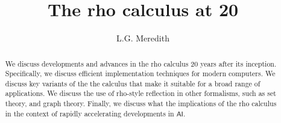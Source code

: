 \def\lastname{Meredith}

\title{The rho calculus at 20}

\author{ L.G. Meredith }

\maketitle              %


\begin{abstract}

  We discuss developments and advances in the rho calculus 20 years
  after its inception. Specifically, we discuss efficient
  implementation techniques for modern computers. We discuss key
  variants of the the calculus that make it suitable for a broad range
  of applications. We discuss the use of rho-style reflection in other
  formalisms, such as set theory, and graph theory. Finally, we
  discuss what the implications of the rho calculus in the context of
  rapidly accelerating developments in $\mathsf{AI}$.

\end{abstract}



